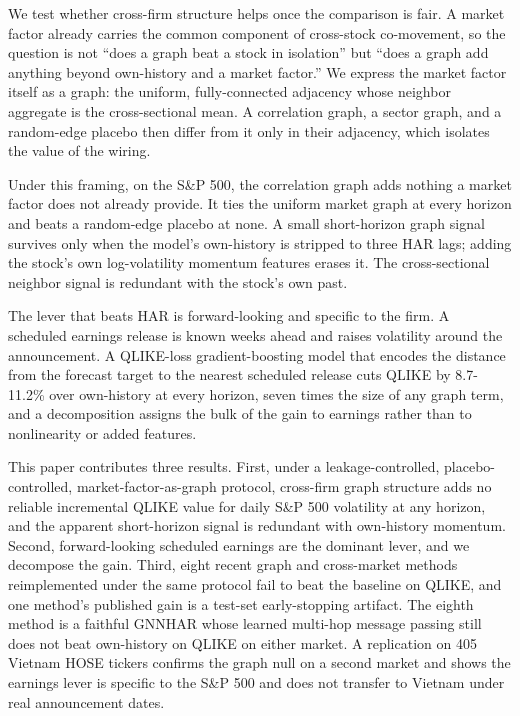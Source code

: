 \documentclass{llncs}
\begin{document}
We test whether cross-firm structure helps once the comparison is fair. A market factor already carries the common
component of cross-stock co-movement, so the question is not ``does a graph beat a stock in isolation'' but ``does a
graph add anything beyond own-history and a market factor.'' We express the market factor itself as a graph: the
uniform, fully-connected adjacency whose neighbor aggregate is the cross-sectional mean. A correlation graph, a
sector graph, and a random-edge placebo then differ from it only in their adjacency, which isolates the value of
the wiring.

Under this framing, on the S\&P 500, the correlation graph adds nothing a market factor does not already provide.
It ties the uniform market graph at every horizon and beats a random-edge placebo at none. A small short-horizon
graph signal survives only when the model's own-history is stripped to three HAR lags; adding the stock's own
log-volatility momentum features erases it. The cross-sectional neighbor signal is redundant with the stock's own
past.

The lever that beats HAR is forward-looking and specific to the firm. A scheduled earnings release is known weeks
ahead and raises volatility around the announcement. A QLIKE-loss gradient-boosting model that encodes the
distance from the forecast target to the nearest scheduled release cuts QLIKE by 8.7-11.2\% over own-history at
every horizon, seven times the size of any graph term, and a decomposition assigns the bulk of the gain to
earnings rather than to nonlinearity or added features.

This paper contributes three results. First, under a leakage-controlled, placebo-controlled, market-factor-as-graph
protocol, cross-firm graph structure adds no reliable incremental QLIKE value for daily S\&P 500 volatility at any
horizon, and the apparent short-horizon signal is redundant with own-history momentum. Second, forward-looking
scheduled earnings are the dominant lever, and we decompose the gain. Third, eight recent graph and cross-market
methods reimplemented under the same protocol fail to beat the baseline on QLIKE, and one method's published gain
is a test-set early-stopping artifact. The eighth method is a faithful GNNHAR whose learned multi-hop message
passing still does not beat own-history on QLIKE on either market. A replication on 405 Vietnam HOSE tickers
confirms the graph null on a second market and shows the earnings lever is specific to the S\&P 500 and does not
transfer to Vietnam under real announcement dates.
\end{document}
